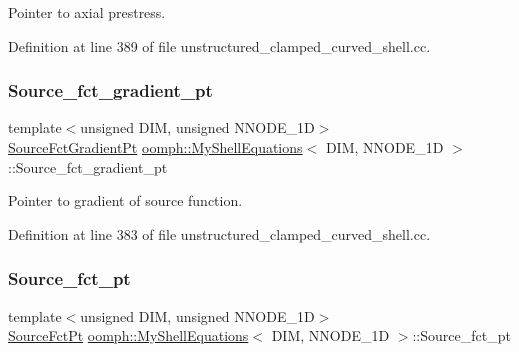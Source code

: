 Pointer to axial prestress. 



Definition at line 389 of file unstructured\+\_\+clamped\+\_\+curved\+\_\+shell.\+cc.

\mbox{\label{classoomph_1_1MyShellEquations_ab45cb2cb03c75c4410fa4288f9a8be90}} 
\subsubsection{\texorpdfstring{Source\+\_\+fct\+\_\+gradient\+\_\+pt}{Source\_fct\_gradient\_pt}}
{\footnotesize\ttfamily template$<$unsigned D\+IM, unsigned N\+N\+O\+D\+E\+\_\+1D$>$ \\
\hyperlink{classoomph_1_1MyShellEquations_a954dcc1b78710f331ed390b716aa07dd}{Source\+Fct\+Gradient\+Pt} \hyperlink{classoomph_1_1MyShellEquations}{oomph\+::\+My\+Shell\+Equations}$<$ D\+IM, N\+N\+O\+D\+E\+\_\+1D $>$\+::Source\+\_\+fct\+\_\+gradient\+\_\+pt\hspace{0.3cm}{\ttfamily [protected]}}



Pointer to gradient of source function. 



Definition at line 383 of file unstructured\+\_\+clamped\+\_\+curved\+\_\+shell.\+cc.

\mbox{\label{classoomph_1_1MyShellEquations_a60988a3591e836a2afecf416d1287985}} 
\subsubsection{\texorpdfstring{Source\+\_\+fct\+\_\+pt}{Source\_fct\_pt}}
{\footnotesize\ttfamily template$<$unsigned D\+IM, unsigned N\+N\+O\+D\+E\+\_\+1D$>$ \\
\hyperlink{classoomph_1_1MyShellEquations_a056d2488b6e65787f5c9935a321b7a9b}{Source\+Fct\+Pt} \hyperlink{classoomph_1_1MyShellEquations}{oomph\+::\+My\+Shell\+Equations}$<$ D\+IM, N\+N\+O\+D\+E\+\_\+1D $>$\+::Source\+\_\+fct\+\_\+pt\hspace{0.3cm}{\ttfamily [protected]}}



